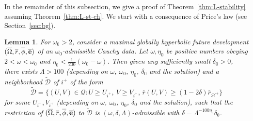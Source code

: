 \documentclass[10pt, reqno]{amsart}
\newtheorem{lemma}[theorem]{Lemma}
\theoremstyle{definition}
\theoremstyle{remark}
\theoremstyle{conjecture}
\numberwithin{equation}{section}
\newcommand{\set}[1]{\{#1\}}
\newcommand{\0}{\emptyset}
\newcommand{\dlt}{\delta}
\newcommand{\Lmb}{\Lambda}
\newcommand{\omg}{\omega}
\newcommand{\Omg}{\Omega}
\newcommand{\bfe}{{\bf e}}
\newcommand{\calD}{\mathcal D}
\newcommand{\calH}{\mathcal H}
\newcommand{\calQ}{\mathcal Q}
\newcommand{\PD}{\calQ}
\newcommand{\EH}{\calH^{+}}
\newcommand{\e}{\bfe}							%
\newcommand{\Omgbg}{\overline{\Omg}}				%
\newcommand{\phibg}{\overline{\phi}}				%
\newcommand{\rbg}{\overline{r}}					%
\newcommand{\ebg}{\overline{\e}}					%
\begin{document}
In the remainder of this subsection, we give a proof of Theorem~\ref{thm:L-stability} assuming Theorem~\ref{thm:L-st-ch}. 
We start with a consequence of Price's law (see Section~\ref{sec:bg}).
\begin{lemma} \label{lem:dlt-adm-exist}
For $\omg_{0} > 2$, consider a maximal globally hyperbolic future development $(\Omgbg, \rbg, \phibg, \ebg)$ of an $\omg_{0}$-admissible Cauchy data. Let $\omg, \eta_{0}$ be positive numbers obeying $2 < \omg < \omg_{0}$ and $\eta_{0} < \frac{1}{200}(\omg_{0} - \omg)$. 
Then given any sufficiently small $\dlt_{0} > 0$, there exists $\Lmb > 100$ (depending on $\omg$, $\omg_0$, $\eta_0$, $\dlt_0$ and the solution) and a neighborhood $\widetilde{\calD}$ of $i^{+}$ of the form
\begin{equation*}
	\widetilde{\calD} = \set{(U, V) \in \PD : U \geq U_{i^{+}}, \ V \geq V_{i^{+}},\, \rbg(U, V) \geq (1 - 2 \dlt) \rbg_{\EH}} 
\end{equation*}
for some $U_{i^{+}}, V_{i^{+}}$ (depending on $\omg$, $\omg_0$, $\eta_0$, $\dlt_0$ and the solution), such that the restriction of $(\Omgbg, \rbg, \phibg, \ebg)$ to $\widetilde{\calD}$ is $(\omg, \dlt, \Lmb)$-admissible with $\dlt = \Lmb^{-100 \eta_{0}} \dlt_{0}$.
\end{lemma}
\end{document}
